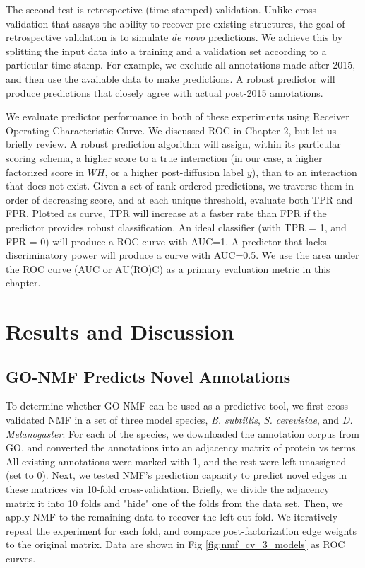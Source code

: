\documentclass[12pt,a4paper]{report}
\begin{document}
The second test is retrospective (time-stamped) validation. Unlike cross-validation that assays the ability to recover pre-existing structures, the goal of retrospective validation is to simulate \textit{de novo} predictions. We achieve this by splitting the input data into a training and a validation set according to a particular time stamp. For example, we exclude all annotations made after 2015, and then use the available data to make predictions. A robust predictor will produce predictions that closely agree with actual post-2015 annotations.

We evaluate predictor performance in both of these experiments using Receiver Operating Characteristic Curve. We discussed ROC in Chapter 2, but let us briefly review. A robust prediction algorithm will assign, within its particular scoring schema, a higher score to a true interaction (in our case, a higher factorized score in $WH$, or a higher post-diffusion label  $y$), than to an interaction that does not exist. Given a set of rank ordered predictions, we traverse them in order of decreasing score, and at each unique threshold, evaluate both TPR and FPR. Plotted as curve, TPR will increase at a faster rate than FPR if the predictor provides robust classification. An ideal classifier (with TPR = 1, and FPR = 0) will produce a ROC curve with AUC=1. A predictor that lacks discriminatory power will produce a curve with AUC=0.5. We use the area under the ROC curve (AUC or AU(RO)C) as a primary evaluation metric in this chapter.

\section{Results and Discussion}
\subsection{GO-NMF Predicts Novel Annotations}

To determine whether GO-NMF can be used as a predictive tool, we first cross-validated NMF in a set of three model species, \textit{B. subtillis}, \textit{S. cerevisiae}, and \textit{D. Melanogaster}. For each of the species, we downloaded the annotation corpus from GO, and converted the annotations into an adjacency matrix of protein vs terms. All existing annotations were marked with 1, and the rest were left unassigned (set to 0). Next, we tested NMF's prediction capacity to predict novel edges in these matrices via 10-fold cross-validation. Briefly, we divide the adjacency matrix it into 10 folds and "hide" one of the folds from the data set. Then, we apply NMF to the remaining data to recover the left-out fold. We iteratively repeat the experiment for each fold, and compare post-factorization edge weights to the original matrix. Data are shown in Fig \ref{fig:nmf_cv_3_models} as ROC curves.
\end{document}
